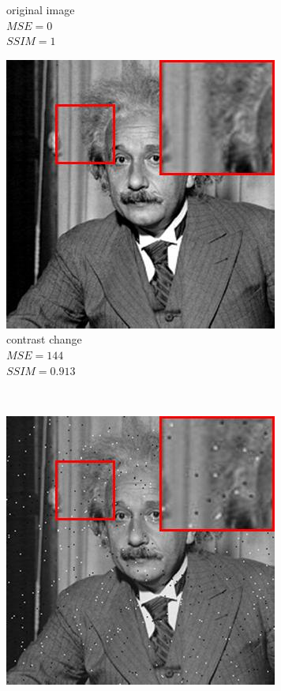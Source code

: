 \begin{figure}
\begin{subfigure}[b]{0.3\textwidth}
         \caption{original image\\$MSE=0$\\$SSIM=1$}
         \label{fig:einstein-orig-s}
     \end{subfigure}
     \hfill
     \begin{subfigure}[b]{0.3\textwidth}
         \centering
         \includegraphics[width=\textwidth]{./figs/image0_bn}
         \caption{contrast change\\$MSE=144$\\$SSIM=0.913$}
         \label{fig:einstein-cc}
     \end{subfigure}
     \\
     \begin{subfigure}[b]{0.3\textwidth}
         \centering
         \includegraphics[width=\textwidth]{./figs/image009_bn}

\end{subfigure}
\end{figure}
